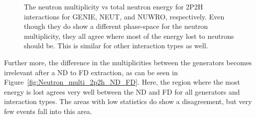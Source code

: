 \documentclass[12pt]{article}
\begin{document}
\begin{figure}
\begin{subfigure}[b]{0.32\textwidth}
\end{subfigure}
\caption{The neutron multiplicity vs total neutron energy for 2P2H interactions for GENIE, NEUT, and NUWRO, respectively.  Even though they do show a different phase-space for the neutron multiplicity, they all agree where most of the energy lost to neutrons should be.  This is similar for other interaction types as well.}
\label{fig:Neutron_multi_2p2h_ND}
\end{figure}

Further more, the difference in the multiplicities between the generators becomes irrelevant after a ND to FD extraction, as can be seen in Figure~\ref{fig:Neutron_multi_2p2h_ND_FD}.
Here, the region where the most energy is lost agrees very well between the ND and FD for all generators and interaction types.
The areas with low statistics do show a disagreement, but very few events fall into this area.
\end{document}
